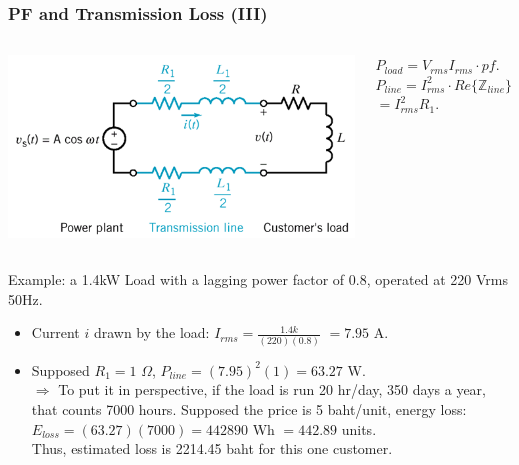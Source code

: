 \documentclass{beamer}
\begin{document}
\begin{frame}[fragile]
\frametitle{PF and Transmission Loss (III)}

\begin{columns}[c]
\includegraphics[width=\textwidth]{src/TransmissionLinesCCT.png}

$P_{load} = V_{rms} I_{rms} \cdot pf$.
\\
$P_{line} = I_{rms}^2 \cdot Re\{ \mathbb{Z}_{line} \}$
$=I_{rms}^2 R_1$.

\end{columns}
\vspace{0.5cm}

Example: a 1.4kW Load with a lagging power factor of 0.8, operated at 220 Vrms 50Hz.

\begin{itemize}
\item Current $i$ drawn by the load: $I_{rms} = \frac{1.4k}{(220)(0.8)}$ $=7.95$ A.
\item Supposed $R_1 = 1$ $\Omega$, $P_{line} = (7.95)^2 (1) = 63.27$ W.
\\
$\Rightarrow$
{\small
To put it in perspective, if the load is run 20 hr/day, 350 days a year,
that counts 7000 hours.
Supposed the price is 5 baht/unit, energy loss: $E_{loss} = (63.27)(7000) = 442890$ Wh $=442.89$ units.
\\ Thus, estimated loss is 2214.45 baht for this one customer. 
}%
\end{itemize}

\end{frame}

\end{document}
